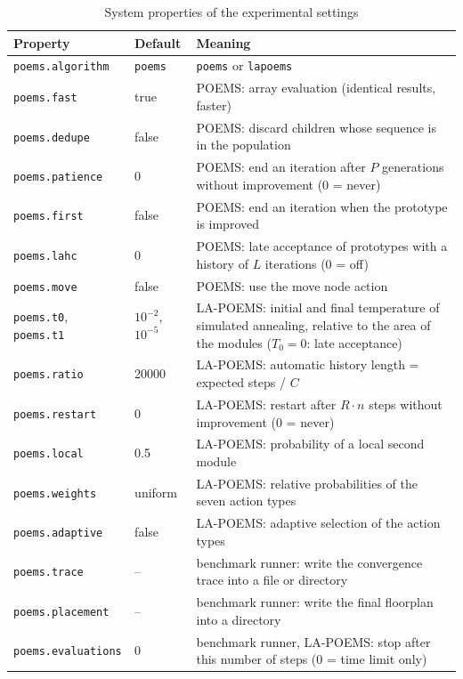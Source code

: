 \begin{table}
\begin{center}
\small
\begin{tabularx}{\textwidth}{@{}llX@{}}
\toprule
Property & Default & Meaning \\
\midrule
{\tt poems.algorithm} & {\tt poems} & {\tt poems} or {\tt lapoems} \\
{\tt poems.fast} & true & POEMS: array evaluation (identical results, faster) \\
{\tt poems.dedupe} & false & POEMS: discard children whose sequence is in the population \\
{\tt poems.patience} & 0 & POEMS: end an iteration after $P$ generations without improvement (0 = never) \\
{\tt poems.first} & false & POEMS: end an iteration when the prototype is improved \\
{\tt poems.lahc} & 0 & POEMS: late acceptance of prototypes with a history of $L$ iterations (0 = off) \\
{\tt poems.move} & false & POEMS: use the move node action \\
{\tt poems.t0}, {\tt poems.t1} & $10^{-2}$, $10^{-5}$ & LA-POEMS: initial and final temperature of simulated annealing, relative to the area of the modules ($T_0 = 0$: late acceptance) \\
{\tt poems.ratio} & 20000 & LA-POEMS: automatic history length = expected steps / $C$ \\
{\tt poems.restart} & 0 & LA-POEMS: restart after $R \cdot n$ steps without improvement (0 = never) \\
{\tt poems.local} & 0.5 & LA-POEMS: probability of a local second module \\
{\tt poems.weights} & uniform & LA-POEMS: relative probabilities of the seven action types \\
{\tt poems.adaptive} & false & LA-POEMS: adaptive selection of the action types \\
{\tt poems.trace} & -- & benchmark runner: write the convergence trace into a file or directory \\
{\tt poems.placement} & -- & benchmark runner: write the final floorplan into a directory \\
{\tt poems.evaluations} & 0 & benchmark runner, LA-POEMS: stop after this number of steps (0 = time limit only) \\
\bottomrule
\end{tabularx}
\end{center}
\caption{System properties of the experimental settings}
\label{tab:switches}
\end{table}
